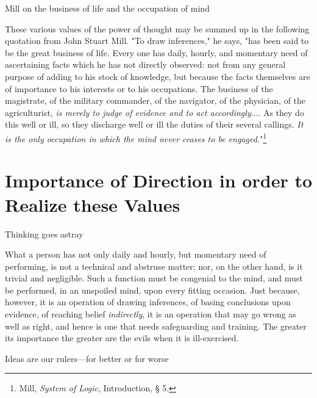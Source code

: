 \documentclass[letterpaper]{book}
\begin{document}
Mill on the business of life and the occupation of mind

These various values of the power of thought may be summed up in the
following quotation from John Stuart Mill. "To draw inferences," he
says, "has been said to be the great business of life. Every one has
daily, hourly, and momentary need of ascertaining facts which he has not
directly observed: not from any general purpose of adding to his stock
of knowledge, but because the facts themselves are of importance to his
interests or to his occupations. The business of the magistrate, of the
military commander, of the navigator, of the physician, of the
agriculturist, \emph{is merely to judge of evidence and to act
accordingly}.... As they do this well or ill, so they discharge well or
ill the duties of their several callings. \emph{It is the only
occupation in which the mind never ceases to be
engaged.}"\footnote{Mill, \emph{System of Logic}, Introduction, § 5.}

\section{Importance of Direction in order to Realize these Values}

Thinking goes astray

What a person has not only daily and hourly, but momentary need of
performing, is not a technical and abstruse matter; nor, on the other
hand, is it trivial and negligible. Such a function must be congenial to
the mind, and must be performed, in an unspoiled mind, upon every
fitting occasion. Just because, however, it is an operation of drawing
inferences, of basing conclusions upon evidence, of reaching belief
\emph{indirectly}, it
is
an operation that may go wrong as well as right, and hence is one that
needs safeguarding and training. The greater its importance the greater
are the evils when it is ill-exercised.

Ideas are our rulers---for better or for worse
\end{document}
